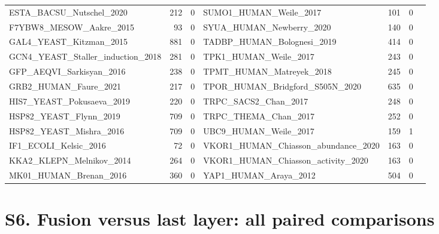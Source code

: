 \documentclass[11pt,a4paper]{article}
\begin{document}
\begin{table}[H]
{\begin{tabular}{lrrllrr}
ESTA\_BACSU\_Nutschel\_2020 & 212 & 0 & SUMO1\_HUMAN\_Weile\_2017 & 101 & 0 \\
F7YBW8\_MESOW\_Aakre\_2015 & 93 & 0 & SYUA\_HUMAN\_Newberry\_2020 & 140 & 0 \\
GAL4\_YEAST\_Kitzman\_2015 & 881 & 0 & TADBP\_HUMAN\_Bolognesi\_2019 & 414 & 0 \\
GCN4\_YEAST\_Staller\_induction\_2018 & 281 & 0 & TPK1\_HUMAN\_Weile\_2017 & 243 & 0 \\
GFP\_AEQVI\_Sarkisyan\_2016 & 238 & 0 & TPMT\_HUMAN\_Matreyek\_2018 & 245 & 0 \\
GRB2\_HUMAN\_Faure\_2021 & 217 & 0 & TPOR\_HUMAN\_Bridgford\_S505N\_2020 & 635 & 0 \\
HIS7\_YEAST\_Pokusaeva\_2019 & 220 & 0 & TRPC\_SACS2\_Chan\_2017 & 248 & 0 \\
HSP82\_YEAST\_Flynn\_2019 & 709 & 0 & TRPC\_THEMA\_Chan\_2017 & 252 & 0 \\
HSP82\_YEAST\_Mishra\_2016 & 709 & 0 & UBC9\_HUMAN\_Weile\_2017 & 159 & 1 \\
IF1\_ECOLI\_Kelsic\_2016 & 72 & 0 & VKOR1\_HUMAN\_Chiasson\_abundance\_2020 & 163 & 0 \\
KKA2\_KLEPN\_Melnikov\_2014 & 264 & 0 & VKOR1\_HUMAN\_Chiasson\_activity\_2020 & 163 & 0 \\
MK01\_HUMAN\_Brenan\_2016 & 360 & 0 & YAP1\_HUMAN\_Araya\_2012 & 504 & 0 \\
\bottomrule
\end{tabular}}\end{table}

\section*{S6. Fusion versus last layer: all paired comparisons}
\end{document}
